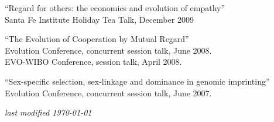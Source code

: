 \documentclass[overlapped,line]{res}
\begin{document}
\begin{resume}
``Regard for others: the economics and evolution of empathy'' \\
Santa Fe Institute Holiday Tea Talk, December 2009

``The Evolution of Cooperation by Mutual Regard'' \\
Evolution Conference, concurrent session talk, June 2008. \\
EVO-WIBO Conference, session talk, April 2008. 

``Sex-specific selection, sex-linkage and dominance in genomic imprinting'' \\
Evolution Conference, concurrent session talk, June 2007. 



\begin{center} 
\vspace{\fill}
\small \it last modified \today
\end{center}

\end{resume}
\end{document}
